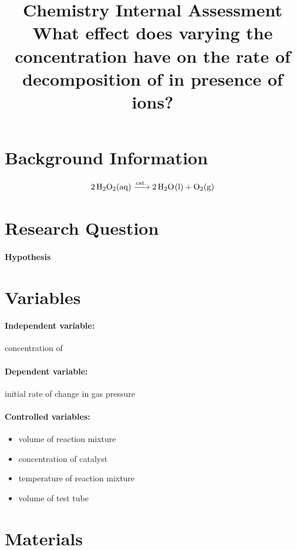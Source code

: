 \documentclass[a4paper, 12pt]{article}
\title{
\textbf{Chemistry Internal Assessment}\\
\bigskip
What effect does varying the concentration have on the rate of decomposition of \ce{H2O2} in presence of \ce{Fe^3+} ions?
}
\author{}
\date{}
\begin{document}
\maketitle

\section*{Background Information}
$$\ce{2 H2O2(aq) ->[{cat.}] 2 H2O(l) + O2(g)}$$

\section*{Research Question}
\paragraph{Hypothesis}

\section*{Variables}
\paragraph{Independent variable:}
concentration of 

\paragraph{Dependent variable:}
initial rate of change in gas pressure

\paragraph{Controlled variables:}
\begin{itemize}
    \item volume of reaction mixture
    \item concentration of  catalyst
    \item temperature of reaction mixture
    \item volume of test tube
\end{itemize}

\section*{Materials}
\end{document}
